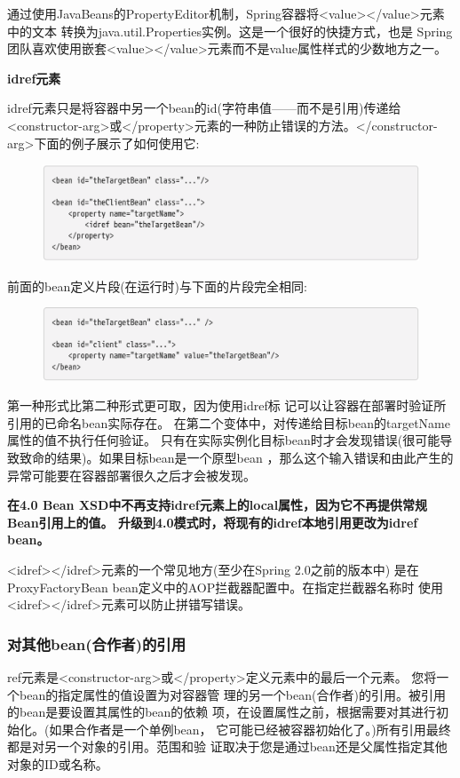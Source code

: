 通过使用JavaBeans的PropertyEditor机制，Spring容器将<value></value>元素中的文本
转换为java.util.Properties实例。这是一个很好的快捷方式，也是
Spring团队喜欢使用嵌套<value></value>元素而不是value属性样式的少数地方之一。

\noindent \small \textbf{idref元素}

idref元素只是将容器中另一个bean的id(字符串值——而不是引用)传递给<constructor-arg>或</property>元素的一种防止错误的方法。</constructor-arg>下面的例子展示了如何使用它:

\begin{figure}[ht]
    \centering
    \includegraphics[width=1\linewidth]{./Figure/IMG_code_35.png}
\end{figure}

前面的bean定义片段(在运行时)与下面的片段完全相同:

\begin{figure}[ht]
    \centering
    \includegraphics[width=1\linewidth]{./Figure/IMG_code_36.png}
\end{figure}

第一种形式比第二种形式更可取，因为使用idref标
记可以让容器在部署时验证所引用的已命名bean实际存在。
在第二个变体中，对传递给目标bean的targetName属性的值不执行任何验证。
只有在实际实例化目标bean时才会发现错误(很可能导致致命的结果)。如果目标bean是一个原型bean
，那么这个输入错误和由此产生的异常可能要在容器部署很久之后才会被发现。

\textbf{在4.0 Bean XSD中不再支持idref元素上的local属性，因为它不再提供常规Bean引用上的值。 升级到4.0模式时，将现有的idref本地引用更改为idref bean。}


<idref></idref>元素的一个常见地方(至少在Spring 2.0之前的版本中)
是在ProxyFactoryBean bean定义中的AOP拦截器配置中。在指定拦截器名称时
使用<idref></idref>元素可以防止拼错写错误。

\subsubsection{对其他bean(合作者)的引用}
ref元素是<constructor-arg>或</property>定义元素中的最后一个元素。
您将一个bean的指定属性的值设置为对容器管
理的另一个bean(合作者)的引用。被引用的bean是要设置其属性的bean的依赖
项，在设置属性之前，根据需要对其进行初始化。(如果合作者是一个单例bean，
它可能已经被容器初始化了。)所有引用最终都是对另一个对象的引用。范围和验
证取决于您是通过bean还是父属性指定其他对象的ID或名称。

